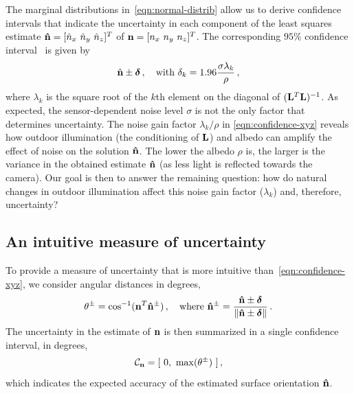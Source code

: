 The marginal distributions in~\eqref{eqn:normal-distrib} allow us to derive confidence intervals that indicate the uncertainty in each component of the least squares estimate ${\bf \hat n} = [ \hat n_x \ \hat n_y \ \hat n_z ]^T$ of ${\bf n} = [ n_x \ n_y \ n_z ]^T$. The corresponding $95\%$ confidence interval~\cite{hastie-book-09} is given by
%
\begin{equation}
\hat{\mathbf{n}} \pm \boldsymbol \delta \,, \quad \text{with } \delta_k = 1.96 \frac{\sigma\lambda_k}{\rho} \,,
\label{eqn:confidence-xyz}
\end{equation}
%
where $\lambda_k$ is the square root of the $k$th element on the diagonal of $({\bf L}^T{\bf L})^{-1}$. As expected, the sensor-dependent noise level $\sigma$ is not the only factor that determines uncertainty. The noise gain factor $\lambda_k/\rho$ in \eqref{eqn:confidence-xyz} reveals how outdoor illumination (the conditioning of ${\bf L}$) and albedo can amplify the effect of noise on the solution ${\bf \hat n}$. The lower the albedo $\rho$ is, the larger is the variance in the obtained estimate $\bf \hat n$ (as less light is reflected towards the camera). Our goal is then to answer the remaining question: how do natural changes in outdoor illumination affect this noise gain factor ($\lambda_k$) and, therefore, uncertainty?

\subsection{An intuitive measure of uncertainty}
\label{subsec:measure_uncertainty}

To provide a measure of uncertainty that is more intuitive than~\eqref{eqn:confidence-xyz}, we consider angular distances in degrees,
%
\begin{equation}
\theta^\pm = \cos^{-1}(\mathbf{n}^T{\bf \hat n}^\pm)\,,
\quad \text{where }
{\bf \hat n}^\pm = \frac{{\bf \hat n} \pm \boldsymbol \delta}{\lVert{\bf \hat n} \pm \boldsymbol \delta \rVert}\,.
\label{eqn:angular-dist}
\end{equation}
%
The uncertainty in the estimate of ${\bf n}$ is then summarized in a single confidence interval, in degrees,
%
\begin{equation}
\mathcal{C}_{\bf n} = [ \ 0, \ \max (\theta^\pm) \ ]\,,
\label{eqn:confidence-degrees}
\end{equation}
which indicates the expected accuracy of the estimated surface orientation ${\bf \hat n}$.

